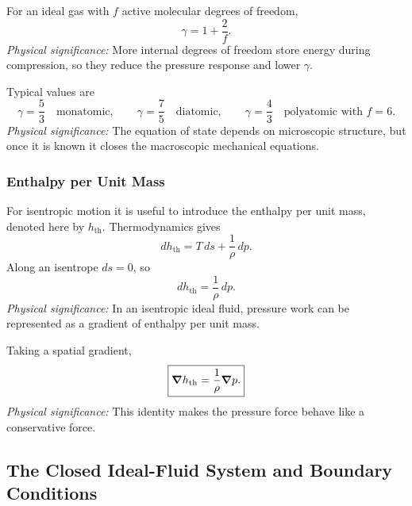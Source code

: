 \documentclass[../main.tex]{subfiles}
\begin{document}
For an ideal gas with $f$ active molecular degrees of freedom,
\begin{equation}
  \boxed{\gamma=1+\frac{2}{f}.}
  \label{eq:lec12_gamma_degrees_freedom}
\end{equation}
\textit{Physical significance:} More internal degrees of freedom store energy during compression, so they reduce the pressure response and lower $\gamma$.

Typical values are
\begin{equation}
  \boxed{
  \gamma=\frac{5}{3}\quad\text{monatomic},\qquad
  \gamma=\frac{7}{5}\quad\text{diatomic},\qquad
  \gamma=\frac{4}{3}\quad\text{polyatomic with } f=6.}
  \label{eq:lec12_gamma_examples}
\end{equation}
\textit{Physical significance:} The equation of state depends on microscopic structure, but once it is known it closes the macroscopic mechanical equations.

\subsubsection{Enthalpy per Unit Mass}\label{subsec:lec12:enthalpy}
For isentropic motion it is useful to introduce the enthalpy per unit mass, denoted here by $h_{\mathrm{th}}$. Thermodynamics gives
\begin{equation}
  dh_{\mathrm{th}}=T\,ds+\frac{1}{\rho}\,dp.
  \label{eq:lec12_enthalpy_differential}
\end{equation}
Along an isentrope $ds=0$, so
\begin{equation}
  \boxed{dh_{\mathrm{th}}=\frac{1}{\rho}\,dp.}
  \label{eq:lec12_isentropic_enthalpy}
\end{equation}
\textit{Physical significance:} In an isentropic ideal fluid, pressure work can be represented as a gradient of enthalpy per unit mass.

Taking a spatial gradient,
\begin{equation}
  \boxed{\grad h_{\mathrm{th}}=\frac{1}{\rho}\grad p.}
  \label{eq:lec12_enthalpy_gradient}
\end{equation}
\textit{Physical significance:} This identity makes the pressure force behave like a conservative force.

\subsection{The Closed Ideal-Fluid System and Boundary Conditions}\label{sec:lec12:closed-system}
\end{document}
